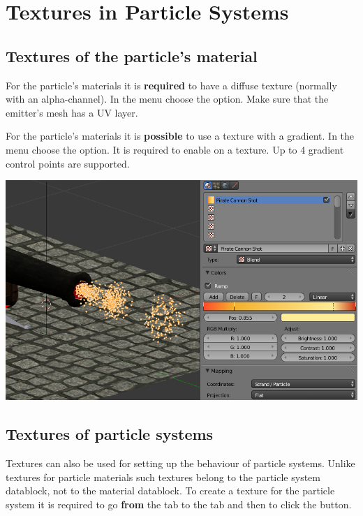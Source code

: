 \documentclass[a4paper,12pt,oneside]{sphinxmanual}
\begin{document}
\section{Textures in Particle Systems}
\label{particles:id14}\label{particles:particles-textures}

\subsection{Textures of the particle's material}
\label{particles:id15}
For the  particle's materials it is \textbf{required} to have a diffuse texture (normally with an alpha-channel). In the  menu choose the  option.  Make sure that the emitter's mesh has a UV layer.

For the  particle's materials it is \textbf{possible} to use a  texture with a  gradient. In the  menu choose the  option. It is required to enable  on a texture. Up to 4 gradient control points are supported.

{\hfill\includegraphics[width=1.000\linewidth]{particles_settings_ramp_color.jpg}\hfill}


\subsection{Textures of particle systems}
\label{particles:id16}
Textures can also be used for setting up the behaviour of particle systems. Unlike textures for particle materials such textures belong to the particle system datablock, not to the material datablock. To create a texture for the particle system it is required to go \textbf{from} the  tab to the  tab and then to click the  button.
\end{document}
